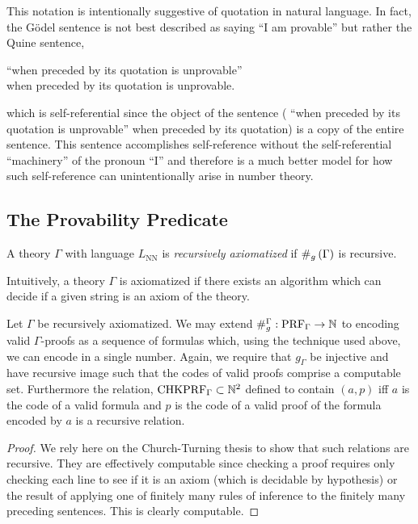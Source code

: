 \documentclass[12pt]{article}
\begin{document}
\begin{remark}
This notation is intentionally suggestive of quotation in natural language. In fact, the G\"{o}del sentence is not best described as saying ``I am provable'' but rather the Quine sentence,
\begin{center}
``when preceded by its quotation is unprovable'' \\
when preceded by its quotation is unprovable.
\end{center}
which is self-referential since the object of the sentence ( ``when preceded by its quotation is unprovable'' when preceded by its quotation) is a copy of the entire sentence. This sentence accomplishes self-reference without the self-referential ``machinery'' of the pronoun ``I'' and therefore is a much better model for how such self-reference can unintentionally arise in number theory. 
\end{remark}

\subsection{The Provability Predicate}

\begin{definition}
A theory $\Gamma$ with language $L_{\text{NN}}$ is \textit{recursively axiomatized} if $\#_g\left( \Gamma \right)$ is recursive. 
\end{definition}

\begin{remark}
Intuitively, a theory $\Gamma$ is axiomatized if there exists an algorithm which can decide if a given string is an axiom of the theory. 
\end{remark}

\newcommand{\CHKPRF}{\mathrm{CHKPRF}}

\begin{theorem}
Let $\Gamma$ be recursively axiomatized. We may extend $\#_g^\Gamma : \mathrm{PRF}_{\Gamma} \to \mathbb{N}$ to encoding valid $\Gamma$-proofs as a sequence of formulas which, using the technique used above, we can encode in a single number. Again, we require that $g_{\Gamma}$ be injective and have recursive image such that the codes of valid proofs comprise a computable set. Furthermore the relation, $\CHKPRF_{\Gamma} \subset \N^2$ defined to contain $(a, p)$ iff $a$ is the code of a valid formula and $p$ is the code of a valid proof of the formula encoded by $a$ is a recursive relation. 
\end{theorem}

\begin{proof}
We rely here on the Church-Turning thesis to show that such relations are recursive. They are effectively computable since checking a proof requires only checking each line to see if it is an axiom (which is decidable by hypothesis) or the result of applying one of finitely many rules of inference to the finitely many preceding sentences. This is clearly computable. 
\end{proof}
\end{document}

